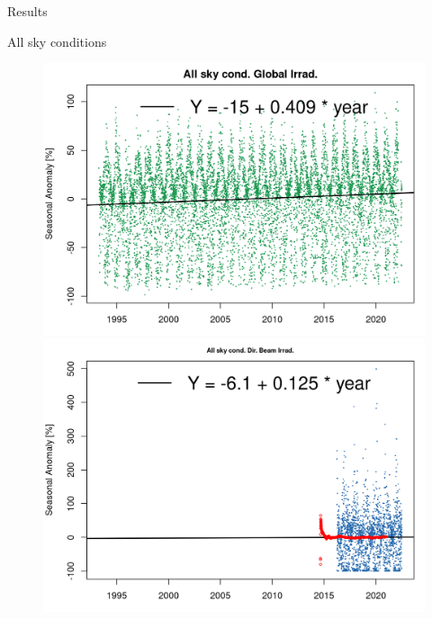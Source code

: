 \documentclass[
  ignorenonframetext,
]{beamer}
\begin{document}
\begin{frame}{Results}
\protect\hypertarget{results}{}
\begin{block}{All sky conditions}
\protect\hypertarget{all-sky-conditions}{}
\begin{figure}

\begin{minipage}[t]{0.50\linewidth}

{\centering 

\includegraphics[width=4.48in,height=\textheight]{images/DHI_GHI_1_longterm_trends_files/figure-html/longtermtrendsALL-4.png}

}

\end{minipage}%
%
\begin{minipage}[t]{0.50\linewidth}

{\centering 

\includegraphics[width=4.48in,height=\textheight]{images/DHI_GHI_1_longterm_trends_files/figure-html/longtermtrendsALL-3.png}

}
\end{minipage}
\end{figure}
\end{block}
\end{frame}
\end{document}
